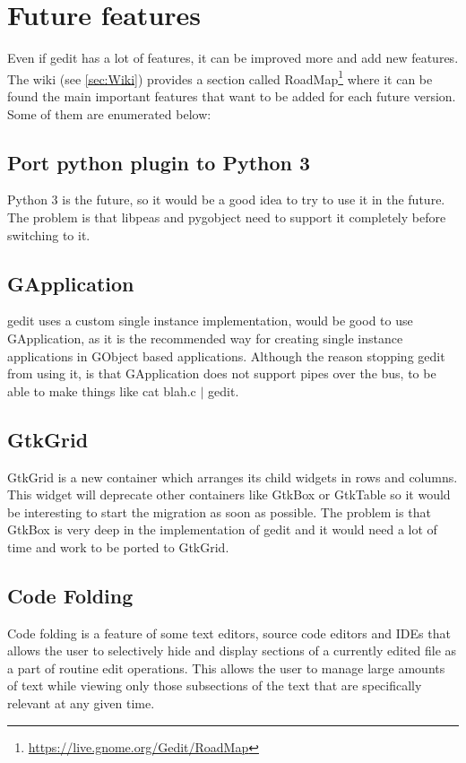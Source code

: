 
\chapter{Future features}

Even if gedit has a lot of features, it can be improved more and add new features. The wiki (see \ref{sec:Wiki}) provides a section called RoadMap\footnote{\url{https://live.gnome.org/Gedit/RoadMap}} where it can be found the main important features that want to be added for each future version. Some of them are enumerated below:

\section{Port python plugin to Python 3}

Python 3 is the future, so it would be a good idea to try to use it in the future. The problem is that libpeas and pygobject need to support it completely before switching to it.

\section{GApplication}

gedit uses a custom single instance implementation, would be good to use GApplication, as it is the recommended way for creating single instance applications in GObject based applications. Although the reason stopping gedit from using it, is that GApplication does not support pipes over the bus, to be able to make things like cat blah.c $|$ gedit.

\newpage
\section{GtkGrid}

GtkGrid is a new container which arranges its child widgets in rows and columns. This widget will deprecate other containers like GtkBox or GtkTable so it would be interesting to start the migration as soon as possible. The problem is that GtkBox is very deep in the implementation of gedit and it would need a lot of time and work to be ported to GtkGrid.

\section{Code Folding}

Code folding is a feature of some text editors, source code editors and IDEs that allows the user to selectively hide and display sections of a currently edited file as a part of routine edit operations. This allows the user to manage large amounts of text while viewing only those subsections of the text that are specifically relevant at any given time.\cite{website:code-folding}

